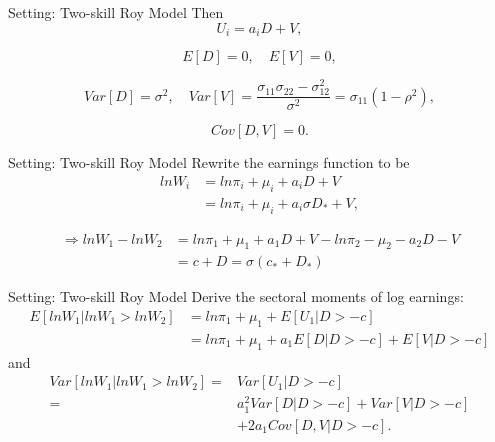 \documentclass{beamer}
\begin{document}
\begin{frame}{Setting: Two-skill Roy Model}
Then
	$$U_i=a_iD+V,$$

	$$E[D]=0,\quad E[V]=0,$$

	$$Var[D]=\sigma^2, \quad Var[V]=\frac{\sigma_{11}\sigma_{22}-\sigma_{12}^2}{\sigma^2}=\sigma_{11}(1-\rho^2),$$

	$$Cov[D,V]=0.$$

\end{frame}
\begin{frame}{Setting: Two-skill Roy Model}
Rewrite the earnings function to be
	\begin{equation}\nonumber
	\begin{aligned}
	lnW_i&=ln\pi_i+\mu_i+a_iD+V \\
	&=ln\pi_i+\mu_i+a_i\sigma D_*+V,
	\end{aligned}
	\end{equation}

\pause
	\begin{equation}\nonumber
		\begin{aligned}
		\Rightarrow lnW_1-lnW_2&=ln\pi_1+\mu_1+a_1D+V-ln\pi_2-\mu_2-a_2D-V \\
		&=c+D=\sigma(c_*+D_*)
		\end{aligned}
	\end{equation}
\end{frame}
\begin{frame}{Setting: Two-skill Roy Model}
Derive the sectoral moments of log earnings:
	\begin{equation}\nonumber
	\begin{aligned}
	E[lnW_1|lnW_1>lnW_2]&=ln\pi_1+\mu_1+E[U_1|D>-c] \\
	&=ln\pi_1+\mu_1+a_1E[D|D>-c]+E[V|D>-c]
	\end{aligned}
	\end{equation}
and
	\begin{equation}\nonumber
	\begin{aligned}
	Var[lnW_1|lnW_1>lnW_2]=&Var[U_1|D>-c] \\
	=&a^2_1Var[D|D>-c]+Var[V|D>-c] \\
	&+2a_1Cov[D,V|D>-c].
	\end{aligned}
	\end{equation}
\end{frame}
\end{document}
